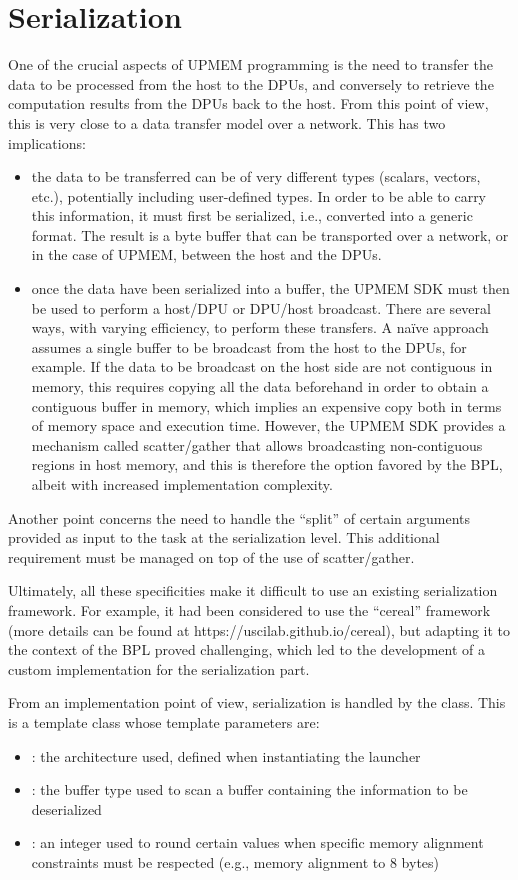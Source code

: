 \section{Serialization}
One of the crucial aspects of UPMEM programming is the need to transfer the data to be processed from the host
 to the DPUs, and conversely to retrieve the computation results from the DPUs back to the host. 
 From this point of view, this is very close to a data transfer model over a network.
This has two implications:
\begin{itemize}
\item the data to be transferred can be of very different types (scalars, vectors, etc.), potentially including 
user-defined types. In order to be able to carry this information, it must first be serialized, i.e., 
converted into a generic format. The result is a byte buffer that can be transported over a network, 
or in the case of UPMEM, between the host and the DPUs.
\item once the data have been serialized into a buffer, the UPMEM SDK must then be used to perform a host/DPU 
or DPU/host broadcast. There are several ways, with varying efficiency, to perform these transfers. 
A naïve approach assumes a single buffer to be broadcast from the host to the DPUs, for example.
 If the data to be broadcast on the host side are not contiguous in memory, this requires copying all 
 the data beforehand in order to obtain a contiguous buffer in memory, which implies an expensive copy 
 both in terms of memory space and execution time. However, the UPMEM SDK provides a mechanism called scatter/gather 
 that allows broadcasting non-contiguous regions in host memory, and this is therefore the option favored by the BPL,
  albeit with increased implementation complexity.
\end{itemize}

Another point concerns the need to handle the “split” of certain arguments provided as input to the task at the 
serialization level. This additional requirement must be managed on top of the use of scatter/gather.

Ultimately, all these specificities make it difficult to use an existing serialization framework. 
For example, it had been considered to use the “cereal” framework 
(more details can be found at https://uscilab.github.io/cereal), but adapting it to the context of the BPL proved challenging, 
which led to the development of a custom implementation for the serialization part.

From an implementation point of view, serialization is handled by the  class. 
This is a template class whose template parameters are:
\begin{itemize}
\item {}: the architecture used, defined when instantiating the launcher
\item {}: the buffer type used to scan a buffer containing the information to be deserialized
\item {}: an integer used to round certain values when specific memory alignment constraints 
must be respected (e.g., memory alignment to 8 bytes)
\end{itemize}	

